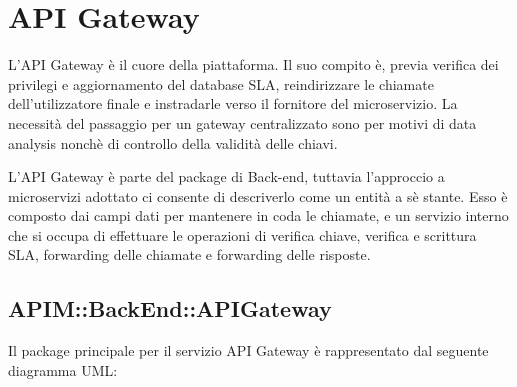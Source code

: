 \newpage
\section{API Gateway}

L'API Gateway è il cuore della piattaforma. Il suo compito è, previa verifica dei privilegi e aggiornamento del database SLA, reindirizzare le chiamate dell'utilizzatore finale e instradarle verso il fornitore del microservizio.  La necessità del passaggio per un gateway centralizzato sono per motivi di data analysis nonchè di controllo della validità delle chiavi.

L'API Gateway è parte del package di Back-end, tuttavia l'approccio a microservizi adottato ci consente di descriverlo come un entità a sè stante. Esso è composto dai campi dati per mantenere in coda le chiamate, e un servizio interno che si occupa di effettuare le operazioni di verifica chiave, verifica e scrittura SLA, forwarding delle chiamate e forwarding delle risposte. 

\subsection{APIM::BackEnd::APIGateway}

Il package principale per il servizio API Gateway è rappresentato dal seguente diagramma UML:


